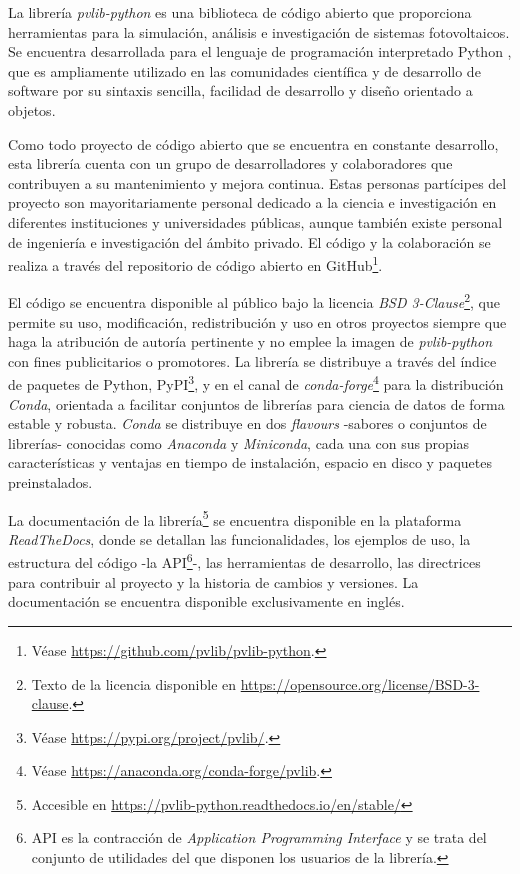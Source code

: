 La librería \textit{pvlib-python} es una biblioteca de código abierto que proporciona herramientas para la simulación, análisis e investigación de sistemas fotovoltaicos. Se encuentra desarrollada para el lenguaje de programación interpretado Python \cite{CS-R9526}, que es ampliamente utilizado en las comunidades científica y de desarrollo de software por su sintaxis sencilla, facilidad de desarrollo y diseño orientado a objetos.

Como todo proyecto de código abierto que se encuentra en constante desarrollo, esta librería cuenta con un grupo de desarrolladores y colaboradores que contribuyen a su mantenimiento y mejora continua. Estas personas partícipes del proyecto son mayoritariamente personal dedicado a la ciencia e investigación en diferentes instituciones y universidades públicas, aunque también existe personal de ingeniería e investigación del ámbito privado. El código y la colaboración se realiza a través del repositorio de código abierto en GitHub\footnote{Véase \url{https://github.com/pvlib/pvlib-python}.}.

El código se encuentra disponible al público bajo la licencia \textit{BSD 3-Clause}\footnote{Texto de la licencia disponible en \url{https://opensource.org/license/BSD-3-clause}.}, que permite su uso, modificación, redistribución y uso en otros proyectos siempre que haga la atribución de autoría pertinente y no emplee la imagen de \textit{pvlib-python} con fines publicitarios o promotores. La librería se distribuye a través del índice de paquetes de Python, PyPI\footnote{Véase \url{https://pypi.org/project/pvlib/}.}, y en el canal de \textit{conda-forge}\footnote{Véase \url{https://anaconda.org/conda-forge/pvlib}.} para la distribución \textit{Conda}, orientada a facilitar conjuntos de librerías para ciencia de datos de forma estable y robusta. \textit{Conda} se distribuye en dos \textit{flavours} -sabores o conjuntos de librerías- conocidas como \textit{Anaconda} y \textit{Miniconda}, cada una con sus propias características y ventajas en tiempo de instalación, espacio en disco y paquetes preinstalados.

La documentación de la librería\footnote{Accesible en \url{https://pvlib-python.readthedocs.io/en/stable/}} se encuentra disponible en la plataforma\\ \mbox{\textit{ReadTheDocs}}, donde se detallan las funcionalidades, los ejemplos de uso, la estructura del código -la API\footnote{API es la contracción de \textit{Application Programming Interface} y se trata del conjunto de utilidades del que disponen los usuarios de la librería.}-, las herramientas de desarrollo, las directrices para contribuir al proyecto y la historia de cambios y versiones. La documentación se encuentra disponible exclusivamente en inglés.

